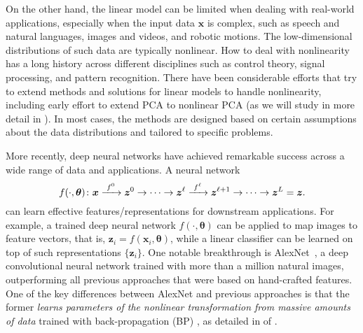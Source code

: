 \documentclass[../../book-main.tex]{subfiles}
\begin{document}
On the other hand, the linear model can be limited when dealing with real-world applications, especially when the input data $\bm{x}$ is complex, such as speech and natural languages, images and videos, and robotic motions. The low-dimensional distributions of such data are typically nonlinear. 
How to deal with nonlinearity has a long history across different disciplines such as control theory, signal processing, and pattern recognition.  There have been considerable efforts that try to extend methods and solutions for linear models to handle nonlinearity, including early effort to extend PCA to nonlinear PCA (as we will study in more detail in ).  In most cases, the methods are designed based on certain assumptions about the data distributions and tailored to specific problems. 

More recently, deep neural networks have achieved remarkable success across a wide range of data and applications. A neural network
\begin{equation}
  f(\cdot, \bm \theta) \colon \bm{x}
  \xrightarrow{\hspace{1mm} f^0 \hspace{1mm}} \bm{z}^0 \rightarrow \cdots
  \rightarrow \bm{z}^\ell \xrightarrow{\hspace{1mm} f^\ell \hspace{1mm}}
  \bm{z}^{\ell+1} \rightarrow  \cdots \to \bm{z}^L = \bm{z}.
\end{equation}
can learn effective features/representations for downstream applications. For example, a trained deep neural network $f(\cdot, \bm \theta)$ can be applied to map images to feature vectors, that is, $\bm{z}_i = f(\bm{x}_i,\bm \theta)$, while a linear classifier can be learned on top of such representations $\{\bm{z}_i\}$. One notable breakthrough is AlexNet~\cite{krizhevsky2012imagenet}, a deep convolutional neural network trained with more than a million natural images, outperforming all previous approaches that were based on hand-crafted features. One of the key differences between AlexNet and previous approaches is that the former \textit{learns parameters of the nonlinear transformation from massive amounts of data} trained with back-propagation (BP) \cite{Back-Prop}, as detailed in  of . 


\end{document}
